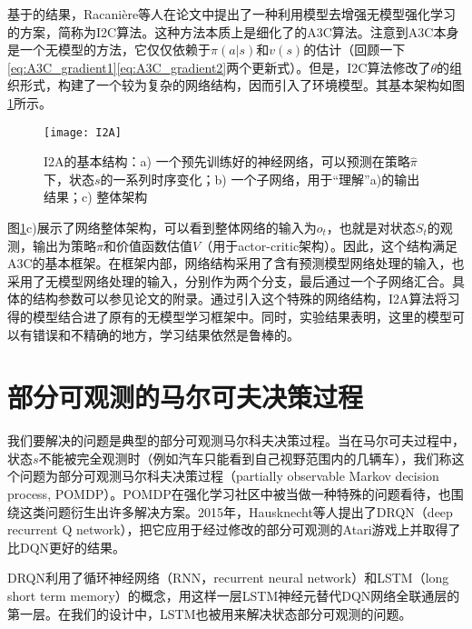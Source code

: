       基于\cite{action-conditional_prediction}的结果，Racani\`{e}re等人在论文\cite{I2A}中提出了一种利用模型去增强无模型强化学习的方案，简称为I2C算法。这种方法本质上是细化了的A3C算法。注意到A3C本身是一个无模型的方法，它仅仅依赖于$\pi(a|s)$和$v(s)$的估计（回顾一下\eqref{eq:A3C_gradient1}\eqref{eq:A3C_gradient2}两个更新式）。但是，I2C算法修改了$\theta$的组织形式，构建了一个较为复杂的网络结构，因而引入了环境模型。其基本架构如图\ref{fig:I2A}所示。
      \begin{figure}[H] %
        \centering
        \texttt{[image: I2A]}
        \caption{I2A的基本结构：a) 一个预先训练好的神经网络，可以预测在策略$\hat{\pi}$下，状态$s$的一系列时序变化；b) 一个子网络，用于``理解''a)的输出结果；c) 整体架构}
        \label{fig:I2A}
      \end{figure}
      \par 图\ref{fig:I2A}c)展示了网络整体架构，可以看到整体网络的输入为$o_t$，也就是对状态$S_t$的观测，输出为策略$\pi$和价值函数估值$V$（用于actor-critic架构）。因此，这个结构满足A3C的基本框架。在框架内部，网络结构采用了含有预测模型网络处理的输入，也采用了无模型网络处理的输入，分别作为两个分支，最后通过一个子网络汇合。具体的结构参数可以参见论文\cite{I2A}的附录。通过引入这个特殊的网络结构，I2A算法将习得的模型结合进了原有的无模型学习框架中。同时，实验结果表明，这里的模型可以有错误和不精确的地方，学习结果依然是鲁棒的。
  
  \section{部分可观测的马尔可夫决策过程}
    我们要解决的问题是典型的部分可观测马尔科夫决策过程。当在马尔可夫过程中，状态$s$不能被完全观测时（例如汽车只能看到自己视野范围内的几辆车），我们称这个问题为部分可观测马尔科夫决策过程（partially observable Markov decision process, POMDP）。POMDP在强化学习社区中被当做一种特殊的问题看待，也围绕这类问题衍生出许多解决方案。2015年，Hausknecht等人提出了DRQN\cite{DRQ}（deep recurrent Q network），把它应用于经过修改的部分可观测的Atari游戏上并取得了比DQN更好的结果。\par
    DRQN利用了循环神经网络（RNN，recurrent neural network）和LSTM\cite{LSTM}（long short term memory）的概念，用这样一层LSTM神经元替代DQN网络全联通层的第一层。在我们的设计中，LSTM也被用来解决状态部分可观测的问题。
  
